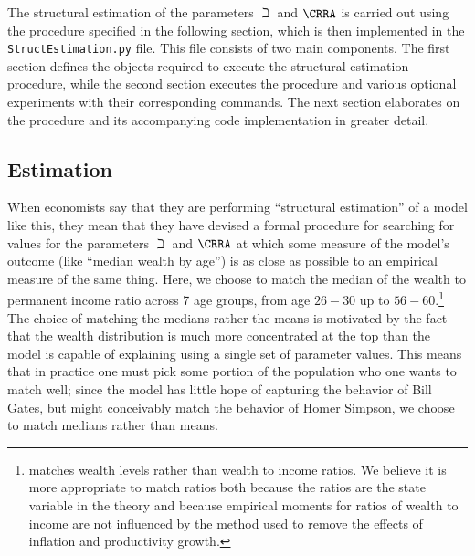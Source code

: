 The structural estimation of the parameters $\beth$ and $\CRRA$ is carried out using
the procedure specified in the following section, which is then implemented in
the \texttt{StructEstimation.py} file. This file consists of two main components. The
first section defines the objects required to execute the structural estimation procedure,
while the second section executes the procedure and various optional
experiments with their corresponding commands. The next section elaborates on the procedure
and its accompanying code implementation in greater detail.

\hypertarget{estimation}{}
\subsection{Estimation}

When economists say that they are performing ``structural estimation''
of a model like this, they mean that they have devised a
formal procedure for searching for values for the parameters $\beth$
and $\CRRA$ at which some measure of the model's outcome (like
``median wealth by age'') is as close as possible to an empirical measure
of the same thing. Here, we choose to match the median of the
wealth to permanent income ratio across 7 age groups, from age $26-30$
up to $56-60$.\footnote{\cite{cagettiWprofiles}
  matches wealth levels rather than wealth to income ratios. We
  believe it is more appropriate to match ratios both because the
  ratios are the state variable in the theory and because empirical
  moments for ratios of wealth to income are not influenced by the
  method used to remove the effects of inflation and productivity
  growth.} The choice of matching the medians rather the means is
motivated by the fact that the wealth distribution is much more
concentrated at the top than the model is capable of explaining using a single
set of parameter values.  This means that in practice one must pick
some portion of the population who one wants to match well; since the
model has little hope of capturing the behavior of Bill Gates, but
might conceivably match the behavior of Homer Simpson, we choose to
match medians rather than means.

